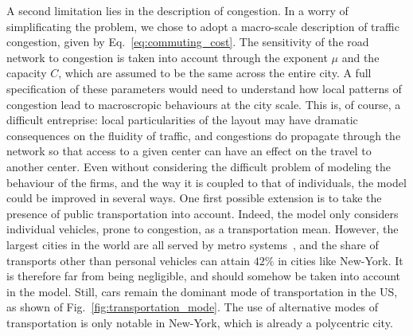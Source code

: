 A second limitation lies in the description of congestion. In a worry of
simplificating the problem, we chose to adopt a macro-scale description of
traffic congestion, given by Eq.~\ref{eq:commuting_cost}. The sensitivity of the
road network to congestion is taken into account through the exponent $\mu$ and
the capacity $C$, which are assumed to be the same across the entire city. A
full specification of these parameters would need to understand how local
patterns of congestion lead to macroscropic behaviours at the city scale.  This
is, of course, a difficult entreprise:  local particularities of the layout may
have dramatic consequences on the fluidity of traffic, and congestions do
propagate through the network so that access to a given center can have an
effect on the travel to another center. 
Even without considering the difficult problem of modeling the behaviour of the
firms, and the way it is coupled to that of individuals, the model could be
improved in several ways. One first possible extension is to take the presence
of public transportation into account. Indeed, the model only considers
individual vehicles, prone to congestion, as a transportation mean.  However,
the largest cities in the world are all served by metro
systems~\cite{Roth:2012}, and the share of transports other than personal
vehicles can attain $42\%$ in cities like New-York. It is therefore far from being negligible, and
should somehow be taken into account in the model.
Still, cars remain the dominant mode of transportation in the
US, as shown of Fig.~\ref{fig:transportation_mode}. The use of alternative modes
of transportation is only notable in New-York, which is already a polycentric
city.\\

